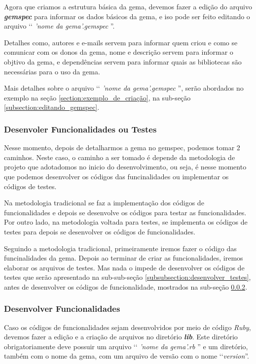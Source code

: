 Agora que criamos a estrutura básica da gema, devemos fazer a edição do arquivo \emph{\textbf{gemspec}}
para informar os dados básicos da gema, e iso pode ser feito editando o arquivo ‘‘ \emph{'nome da gema'.gemspec }''.

Detalhes como, autores e e-mails servem para informar quem criou e como se comunicar com os donos da gema,
nome e descrição servem para informar o objtivo da gema, e dependências servem para informar quais as bibliotecas
são necessárias para o uso da gema.

Mais detalhes sobre o arquivo ‘‘ \emph{'nome da gema'.gemspec }'', serão abordados no exemplo na seção
\ref{section:exemplo_de_criação}, na sub-seção \ref{subsection:editando_gemspec}.


\subsubsection{Desenvoler Funcionalidades ou Testes}
\label{subsubsection:desenvolver_funcionalidades_ou_testes}


Nesse momento, depois de detalharmos a gema no gemspec, podemos tomar 2 caminhos. Neste caso, o caminho a ser
tomado é depende da metodologia de projeto que adotadomos no inicio do desenvolvimento, ou seja, é nesse
momento que podemos desenvolver os códigos das funcinalidades ou implementar os códigos de testes.

Na metodologia tradicional se faz a implementação dos códigos de funcionalidades e depois se
desenvolve os códigos para testar as funcionalidades. Por outro lado, na metodologia voltada para
testes, se implementa os códigos de testes para depois se desenvolver os códigos de funcionalidades.

Seguindo a metodologia tradicional, primeiramente iremos fazer o código das funcinalidades da gema.
Depois ao terminar de criar as funcionalidades, iremos elaborar os arquivos de testes. Mas nada o impede
de desenvolver os códigos de testes que serão apresentado na sub-sub-seção \ref{subsubsection:desenvolver_testes},
antes de desenvolver os códigos de funcionalidade, mostrados na sub-seção
\ref{subsubsection:desenvolver_funcionalidades}.


\subsubsection{Desenvolver Funcionalidades}
\label{subsubsection:desenvolver_funcionalidades}


Caso os códigos de funcionalidades sejam desenvolvidos por meio de código \emph{Ruby}, devemos fazer a
edição e a criação de arquivos no diretório \emph{\textbf{lib}}. Este diretório obrigatoriamente deve
possuir um arquivo ‘‘ \emph{'nome da gema'.rb }'' e um diretório, também com o nome da gema, com um arquivo
de versão com o nome ‘‘\emph{version}''. 

